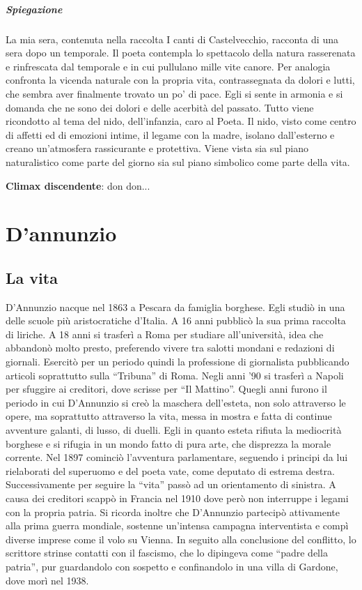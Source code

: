 \documentclass[10pt]{report}
\begin{document}
		\subparagraph[La mia sera]{Spiegazione}La mia sera, contenuta nella raccolta I canti di Castelvecchio, racconta di una sera dopo un temporale. Il poeta contempla lo spettacolo della natura rasserenata e rinfrescata dal temporale e in cui pullulano mille vite canore. Per analogia confronta la vicenda naturale con la propria vita, contrassegnata da dolori e lutti, che sembra aver finalmente trovato un po’ di pace. Egli si sente in armonia e si domanda che ne sono dei dolori e delle acerbità del passato. Tutto viene ricondotto al tema del nido, dell’infanzia, caro al Poeta. Il nido, visto come centro di affetti ed di emozioni intime, il legame con la madre, isolano dall’esterno e creano un’atmosfera rassicurante e protettiva. 
		Viene vista sia sul piano naturalistico come parte del giorno sia sul piano simbolico come parte della vita.
		
		\textbf{Climax discendente}: don don...

		
		
		\section{D'annunzio}
			\subsection[Vita]{La vita}
			D’Annunzio nacque nel 1863 a Pescara da famiglia borghese. Egli studiò in una delle scuole più aristocratiche d’Italia. A 16 anni pubblicò la sua prima raccolta di liriche. A 18 anni si trasferì a Roma per studiare all’università, idea che abbandonò molto presto, preferendo vivere tra salotti mondani e redazioni di giornali. Esercitò per un periodo quindi la professione di giornalista pubblicando articoli soprattutto sulla “Tribuna” di Roma. Negli anni ’90 si trasferì a Napoli per sfuggire ai creditori, dove scrisse per “Il Mattino”. Quegli anni furono il periodo in cui D’Annunzio si creò la maschera dell’esteta, non solo attraverso le opere, ma soprattutto attraverso la vita, messa in mostra e fatta di continue avventure galanti, di lusso, di duelli. Egli in quanto esteta rifiuta la mediocrità borghese e si rifugia in un mondo fatto di pura arte, che disprezza la morale corrente. 
			Nel 1897 cominciò l’avventura parlamentare, seguendo i principi da lui rielaborati del superuomo e del poeta vate, come deputato di estrema destra. Successivamente per seguire la “vita” passò ad un orientamento di sinistra. A causa dei creditori scappò in Francia nel 1910 dove però non interruppe i legami con la propria patria.
			Si ricorda inoltre che D’Annunzio partecipò attivamente alla prima guerra mondiale, sostenne un’intensa campagna interventista e compì diverse imprese come il volo su Vienna. In seguito alla conclusione del conflitto, lo scrittore strinse contatti con il fascismo, che lo dipingeva come “padre della patria”, pur guardandolo con sospetto e confinandolo in una villa di Gardone, dove morì nel 1938.
\end{document}
